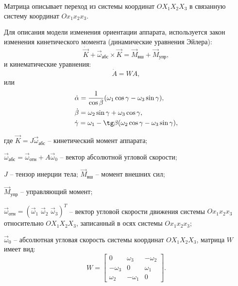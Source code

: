 Матрица описывает переход из системы координат $OX_1X_2X_3$ в связанную систему
координат $Ox_1x_2x_3$.\par
\noindent\indent Для описания модели изменения ориентации аппарата, используется
закон изменения кинетического момента (динамические уравнения Эйлера):
\begin{equation}\label{eq:EulerDynamic}
    \dot{\vec{K}} + \vec{\omega}_{\text{абс}} \times \vec{K} = \vec{M}_{\text{вш}} + \vec{M}_{\text{упр}},
\end{equation}
и кинематические уравнения:
\begin{equation}\label{eq:EulerKinematic}
    \dot{A} = WA,
\end{equation}
или
\begin{equation}
    \begin{aligned}
        & \dot{\alpha} = \frac{1}{\cos\beta}(\omega_1\cos\gamma - \omega_3\sin\gamma), \\
        & \dot{\beta} = \omega_2\sin\gamma + \omega_3\cos\gamma, \\
        & \dot{\gamma} = \omega_1 - \tg\beta(\omega_2\cos\gamma - \omega_3\sin\gamma),
    \end{aligned}
\end{equation}\par
где $\vec{K} = J\vec{\omega}_{\text{абс}}$ -- кинетический момент аппарата;

$\vec{\omega}_{\text{абс}} = \vec{\omega}_{\text{отн}} + A\vec{\omega}_0$ -- вектор
абсолютной угловой скорости;

$J$ -- тензор инерции тела; $\vec{M}_{\text{вш}}$ -- момент внешних сил;

$\vec{M}_{\text{упр}}$ -- управляющий момент;

$\vec{\omega}_{\text{отн}} = (\vec{\omega}_1\,\, \vec{\omega}_2\,\, \vec{\omega}_3)^T$ --
вектор угловой скорости движения системы $Ox_1x_2x_3$ относительно $OX_1X_2X_3$,
записанный в осях системы $Ox_1x_2x_3$;

$\vec{\omega}_0$ -- абсолютная угловая скорость системы координат $OX_1X_2X_3$,
матрица $W$ имеет вид:
\begin{equation}
    W = \begin{bmatrix}
        0 & \omega_3 & -\omega_2 \\
        -\omega_3 & 0 & \omega_1 \\
        \omega_2 & -\omega_1 & 0
    \end{bmatrix}.
\end{equation}
%
